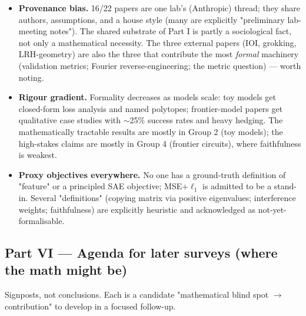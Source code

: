 \begin{itemize}
\item \textbf{Provenance bias.} 16/22 papers are one lab's (Anthropic) thread; they share authors, assumptions, and a house style (many are explicitly "preliminary lab-meeting notes"). The shared substrate of Part I is partly a sociological fact, not only a mathematical necessity. The three external papers (IOI, grokking, LRH-geometry) are also the three that contribute the most \emph{formal} machinery (validation metrics; Fourier reverse-engineering; the metric question) --- worth noting.
\item \textbf{Rigour gradient.} Formality decreases as models scale: toy models get closed-form loss analysis and named polytopes; frontier-model papers get qualitative case studies with $\sim$25\% success rates and heavy hedging. The mathematically tractable results are mostly in Group 2 (toy models); the high-stakes claims are mostly in Group 4 (frontier circuits), where faithfulness is weakest.
\item \textbf{Proxy objectives everywhere.} No one has a ground-truth definition of "feature" or a principled SAE objective; MSE+$\ell_1$ is admitted to be a stand-in. Several "definitions" (copying matrix via positive eigenvalues; interference weights; faithfulness) are explicitly heuristic and acknowledged as not-yet-formalisable.
\end{itemize}


\subsection*{Part VI --- Agenda for later surveys (where the math might be)}

Signposts, not conclusions. Each is a candidate "mathematical blind spot $\to$ contribution" to develop in a focused follow-up.


